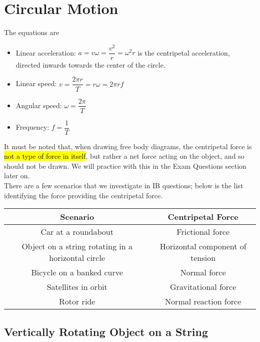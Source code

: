 \documentclass[a4paper,12pt]{article}
\let\oldsection\section
\renewcommand\section{\clearpage\oldsection}
\newcommand{\lb}{\\[8pt]}
\begin{document}
\pagebreak

\section{Circular Motion}

The equations are
\begin{itemize}
  \item Linear acceleration: $a = v\omega = \dfrac{v^2}{r} = \omega^2r$ is the centripetal acceleration, directed inwards towards the center of the circle.
  \item Linear speed: $v = \dfrac{2\pi r}{T} = r\omega = 2\pi r f$
  \item Angular speed: $\omega = \dfrac{2\pi}{T}$
  \item Frequency: $f = \dfrac{1}{T}$
\end{itemize}

It must be noted that, when drawing free body diagrams, the centripetal force is \hl{not a type of force in itself}, but rather a net force acting on the object, and so should not be drawn. We will practice with this in the Exam Questions section later on.\lb
There are a few scenarios that we investigate in IB questions; below is the list identifying the force providing the centripetal force.
\begin{table}[H]
  \centering
  \begin{tabular}{|c|c|}
    \hline
    \rowcolor{BlueGreen!35!white}
    \textbf{Scenario}                                  & \textbf{Centripetal Force}      \\ \hline
    Car at a roundabout                                & Frictional force                \\
    Object on a string rotating in a horizontal circle & Horizontal component of tension \\
    Bicycle on a banked curve                          & Normal force                    \\
    Satellites in orbit                                & Gravitational force             \\
    Rotor ride                                         & Normal reaction force           \\\hline
  \end{tabular}
\end{table}

\pagebreak

\subsection{Vertically Rotating Object on a String}
\end{document}
